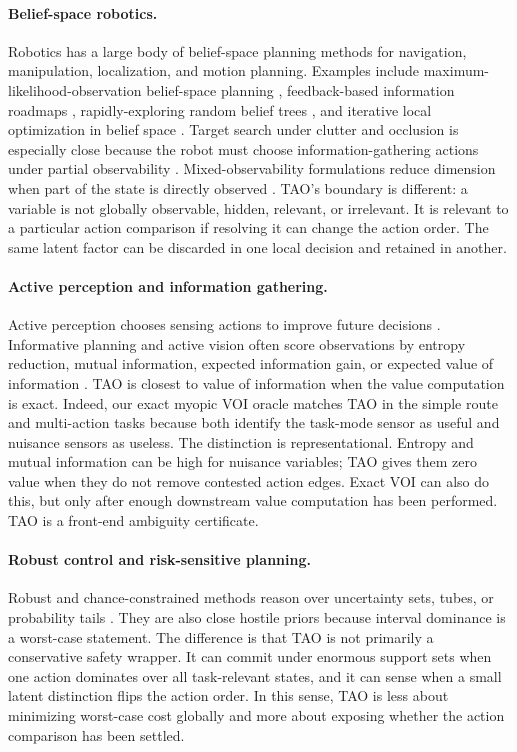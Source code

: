 \documentclass{article}
\begin{document}
\paragraph{Belief-space robotics.}
Robotics has a large body of belief-space planning methods for navigation, manipulation, localization, and motion planning. Examples include maximum-likelihood-observation belief-space planning \citep{platt2010belief}, feedback-based information roadmaps \citep{aghamohammadi2014fips}, rapidly-exploring random belief trees \citep{bry2011rapidly}, and iterative local optimization in belief space \citep{van2012motion}. Target search under clutter and occlusion is especially close because the robot must choose information-gathering actions under partial observability \citep{xiao2019target}. Mixed-observability formulations reduce dimension when part of the state is directly observed \citep{ong2010mixed}. TAO's boundary is different: a variable is not globally observable, hidden, relevant, or irrelevant. It is relevant to a particular action comparison if resolving it can change the action order. The same latent factor can be discarded in one local decision and retained in another.

\paragraph{Active perception and information gathering.}
Active perception chooses sensing actions to improve future decisions \citep{bajcsy1988active}. Informative planning and active vision often score observations by entropy reduction, mutual information, expected information gain, or expected value of information \citep{hollinger2014sampling,chen2011active}. TAO is closest to value of information when the value computation is exact. Indeed, our exact myopic VOI oracle matches TAO in the simple route and multi-action tasks because both identify the task-mode sensor as useful and nuisance sensors as useless. The distinction is representational. Entropy and mutual information can be high for nuisance variables; TAO gives them zero value when they do not remove contested action edges. Exact VOI can also do this, but only after enough downstream value computation has been performed. TAO is a front-end ambiguity certificate.

\paragraph{Robust control and risk-sensitive planning.}
Robust and chance-constrained methods reason over uncertainty sets, tubes, or probability tails \citep{blackmore2011chance,majumdar2017funnel}. They are also close hostile priors because interval dominance is a worst-case statement. The difference is that TAO is not primarily a conservative safety wrapper. It can commit under enormous support sets when one action dominates over all task-relevant states, and it can sense when a small latent distinction flips the action order. In this sense, TAO is less about minimizing worst-case cost globally and more about exposing whether the action comparison has been settled.
\end{document}
